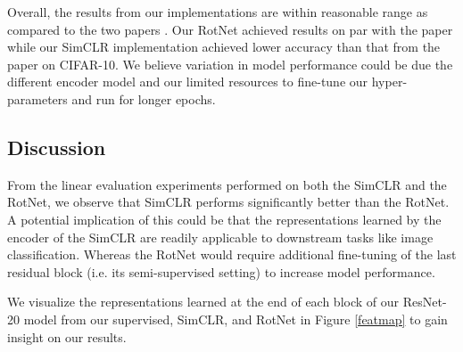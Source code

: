 Overall, the results from our implementations are within reasonable range as compared to the two papers \cite{SimCLR} \cite{RotNet}. Our RotNet achieved results on par with the paper while our SimCLR implementation achieved lower accuracy than that from the paper on CIFAR-10. We believe variation in model performance could be due the different encoder model and our limited resources to fine-tune our hyper-parameters and run for longer epochs.

\subsection{Discussion}

From the linear evaluation experiments performed on both the SimCLR and the RotNet, we observe that SimCLR performs significantly better than the RotNet. A potential implication of this could be that the representations learned by the encoder of the SimCLR are readily applicable to downstream tasks like image classification. Whereas the RotNet would require additional fine-tuning of the last residual block (i.e. its semi-supervised setting) to increase model performance.

We visualize the representations learned at the end of each block of our ResNet-20 model from our supervised, SimCLR, and RotNet in Figure \ref{featmap} to gain insight on our results.

